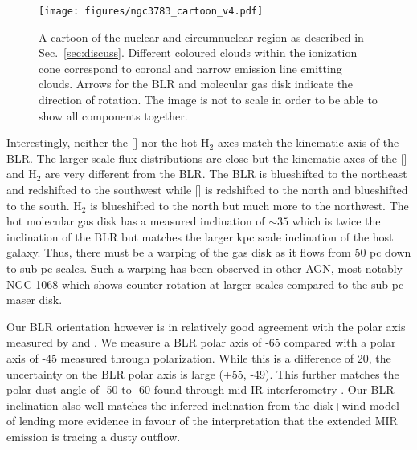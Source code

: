 \documentclass[longauth,]{aa}
\newcommand{\sivi}{[\ion{Si}{vi}]}
\begin{document}
\begin{figure*}
\centering
\texttt{[image: figures/ngc3783\_cartoon\_v4.pdf]}
\caption{A cartoon of the nuclear and circumnuclear region as described in Sec.~\ref{sec:discuss}. Different coloured clouds within the ionization cone correspond to coronal and narrow emission line emitting clouds. Arrows for the BLR and molecular gas disk indicate the direction of rotation. The image is not to scale in order to be able to show all components together.}
\label{fig:cartoon}
\end{figure*}


Interestingly, neither the \sivi{} nor the hot H$_2$ axes match the kinematic axis of the BLR. The larger scale flux distributions are close but the kinematic axes of the \sivi{} and H$_2$ are very different from the BLR. The BLR is blueshifted to the northeast and redshifted to the southwest while \sivi{} is redshifted to the north and blueshifted to the south. H$_2$ is blueshifted to the north but much more to the northwest. The hot molecular gas disk has a measured inclination of $\sim35$\degree{} \citep{Davies:2007aa,Hicks:2009aa,Muller-Sanchez:2011aa} which is twice the inclination of the BLR but matches the larger kpc scale inclination of the host galaxy. Thus, there must be a warping of the gas disk as it flows from 50 pc down to sub-pc scales. Such a warping has been observed in other AGN, most notably NGC 1068 \citep{Impellizzeri:2019aa} which shows counter-rotation at larger scales compared to the sub-pc maser disk.

Our BLR orientation however is in relatively good agreement with the polar axis measured by \citet{smith02} and \citet{smith04}. We measure a BLR polar axis of -65\degree{} compared with a polar axis of -45\degree{} measured through polarization. While this is a difference of 20\degree{}, the uncertainty on the BLR polar axis is large (+55\degree, -49\degree). This further matches the polar dust angle of -50 to -60\degree{} found through mid-IR interferometry \citep{Honig:2013qy,Burtscher:2013aa,lopezgonzaga16}. Our BLR inclination also well matches the inferred inclination from the disk+wind model of \citet{hoenig17} lending more evidence in favour of the interpretation that the extended MIR emission is tracing a dusty outflow.
\end{document}
